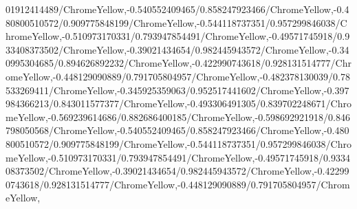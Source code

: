 {\begin{tikzternal}
{01912414489/ChromeYellow,-0.540552409465/0.858247923466/ChromeYellow,-0.480800510572/0.909775848199/ChromeYellow,-0.544118737351/0.957299846038/ChromeYellow,-0.510973170331/0.793947854491/ChromeYellow,-0.49571745918/0.933408373502/ChromeYellow,-0.39021434654/0.982445943572/ChromeYellow,-0.340995304685/0.894626892232/ChromeYellow,-0.422990743618/0.928131514777/ChromeYellow,-0.448129090889/0.791705804957/ChromeYellow,-0.482378130039/0.78533269411/ChromeYellow,-0.345925359063/0.952517441602/ChromeYellow,-0.397984366213/0.843011577377/ChromeYellow,-0.493306491305/0.839702248671/ChromeYellow,-0.569239614686/0.882686400185/ChromeYellow,-0.598692921918/0.846798050568/ChromeYellow,-0.540552409465/0.858247923466/ChromeYellow,-0.480800510572/0.909775848199/ChromeYellow,-0.544118737351/0.957299846038/ChromeYellow,-0.510973170331/0.793947854491/ChromeYellow,-0.49571745918/0.933408373502/ChromeYellow,-0.39021434654/0.982445943572/ChromeYellow,-0.422990743618/0.928131514777/ChromeYellow,-0.448129090889/0.791705804957/ChromeYellow,
}
\end{tikzternal}}
